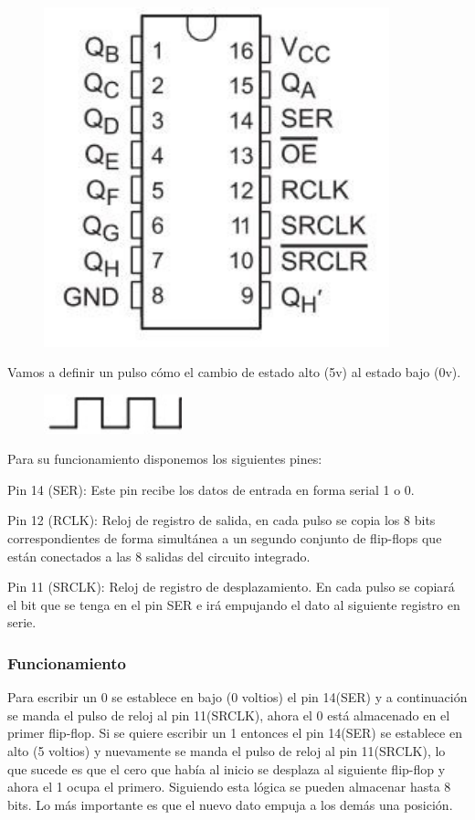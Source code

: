 \documentclass{article}
\begin{document}
\newpage
\begin{figure}[!ht]
\includegraphics[width=10cm]{Pin_74HC595.jpg}
\centering
\cite{74HC595}
\end{figure}

Vamos a definir un pulso cómo el cambio de estado alto (5v) al estado bajo (0v).

\begin{figure}[!ht]
\includegraphics[width=4cm]{Pulso.jpg}
\centering
\end{figure}

Para su funcionamiento disponemos los siguientes pines:

\item
Pin 14 (SER): Este pin recibe los datos de entrada en forma serial 1 o 0.

\item
Pin 12 (RCLK): Reloj de registro de salida, en cada pulso se copia los 8 bits correspondientes de forma simultánea a un segundo conjunto de flip-flops que están conectados a las 8 salidas del circuito integrado.

\item
Pin 11 (SRCLK): Reloj de registro de desplazamiento. En cada pulso se copiará el bit que se tenga en el pin SER e irá empujando el dato al siguiente registro en serie.

\newpage

\subsubsection{Funcionamiento}
Para escribir un 0 se establece en bajo (0 voltios) el pin 14(SER) y a continuación se manda el pulso de reloj al pin 11(SRCLK), ahora el 0 está almacenado en el primer flip-flop. Si se quiere escribir un 1 entonces el pin 14(SER) se establece en alto (5 voltios) y nuevamente se manda el pulso de reloj al pin 11(SRCLK), lo que sucede es que el cero que había al inicio se desplaza al siguiente flip-flop y ahora el 1 ocupa el primero. Siguiendo esta lógica se pueden almacenar hasta 8 bits. Lo más importante es que el nuevo dato empuja a los demás una posición.\newline
\end{document}
